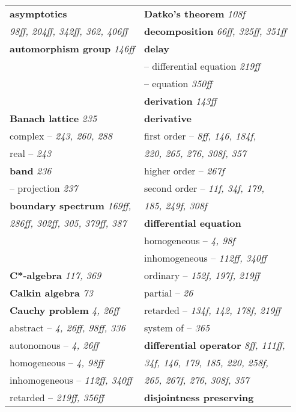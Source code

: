 \documentclass{article}
\begin{document}
\begin{longtable}{p{}p{}}
\textbf{asymptotics} & \textbf{Datko's theorem} \textit{108f} \\
\quad \textit{98ff, 204ff, 342ff, 362, 406ff} & \textbf{decomposition} \textit{66ff, 325ff, 351ff} \\
\textbf{automorphism group} \textit{146ff} & \textbf{delay} \\
& \quad -- differential equation \textit{219ff} \\
& \quad -- equation \textit{350ff} \\
& \textbf{derivation} \textit{143ff} \\
\textbf{Banach lattice} \textit{235} & \textbf{derivative} \\
\quad complex -- \textit{243, 260, 288} & \quad first order -- \textit{8ff, 146, 184f,} \\
\quad real -- \textit{243} & \quad\quad \textit{220, 265, 276, 308f, 357} \\
\textbf{band} \textit{236} & \quad higher order -- \textit{267f} \\
\quad -- projection \textit{237} & \quad second order -- \textit{11f, 34f, 179,} \\
\textbf{boundary spectrum} \textit{169ff,} & \quad\quad \textit{185, 249f, 308f} \\
\quad \textit{286ff, 302ff, 305, 379ff, 387} & \textbf{differential equation} \\
& \quad homogeneous -- \textit{4, 98f} \\
& \quad inhomogeneous -- \textit{112ff, 340ff} \\
\textbf{C*-algebra} \textit{117, 369} & \quad ordinary -- \textit{152f, 197f, 219ff} \\
\textbf{Calkin algebra} \textit{73} & \quad partial -- \textit{26} \\
\textbf{Cauchy problem} \textit{4, 26ff} & \quad retarded -- \textit{134f, 142, 178f, 219ff} \\
\quad abstract -- \textit{4, 26ff, 98ff, 336} & \quad system of -- \textit{365} \\
\quad autonomous -- \textit{4, 26ff} & \textbf{differential operator} \textit{8ff, 111ff,} \\
\quad homogeneous -- \textit{4, 98ff} & \quad \textit{34f, 146, 179, 185, 220, 258f,} \\
\quad inhomogeneous -- \textit{112ff, 340ff} & \quad \textit{265, 267f, 276, 308f, 357} \\
\quad retarded -- \textit{219ff, 356ff} & \textbf{disjointness preserving} \\

\end{longtable}
\end{document}
